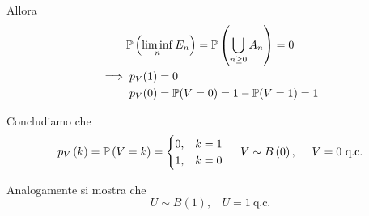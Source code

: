 \begin{enumerate}
Allora\begin{gather*}
\mathbb{P}\left(\liminf _{n} E_{n}\right) =\mathbb{P}\left(\bigcup _{n\geq 0} A_{n}\right) =0\\
\begin{aligned}
\implies p_{V}( 1) & =0\\
p_{V}( 0) & =\mathbb{P}( V=0) =1-\mathbb{P}( V=1) =1
\end{aligned}
\end{gather*}

Concludiamo che\begin{equation*}
p_{V}\left( k\right) =\PP\left( V=k\right) =\begin{cases}
0, & k=1\\
1, & k=0
\end{cases} \ \ \ \ V\sim B\left( 0\right) ,\ \ \ \ V=0\ \text{q.c.}
\end{equation*}

Analogamente si mostra che\begin{equation*}
U\sim B( 1) ,\ \ \ \ U=1\ \text{q.c.}
\end{equation*}
\end{enumerate}
